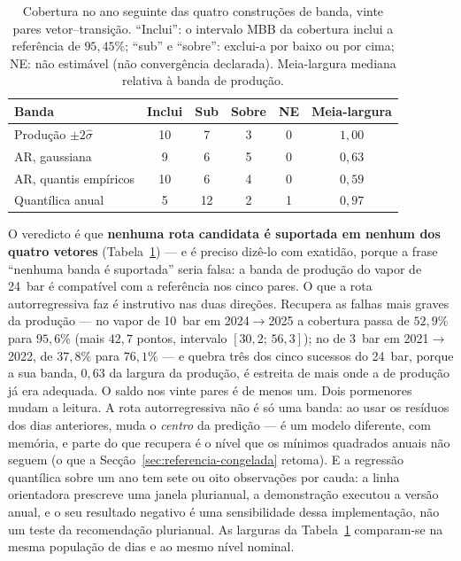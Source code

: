 \begin{table}[htbp]
  \centering
  \caption[Bandas alternativas nos vinte pares]{Cobertura no ano seguinte
  das quatro construções de banda, vinte pares vetor--transição. ``Inclui'':
  o intervalo MBB da cobertura inclui a referência de $95{,}45\%$; ``sub'' e
  ``sobre'': exclui-a por baixo ou por cima; NE: não estimável (não
  convergência declarada). Meia-largura mediana relativa à banda de
  produção.}
  \label{tab:bandas}
  \begin{tabular}{lccccc}
    \toprule
    Banda & Inclui & Sub & Sobre & NE & Meia-largura \\
    \midrule
    Produção $\pm 2\hat\sigma$   & 10 & 7  & 3 & 0 & $1{,}00$ \\
    AR, gaussiana                & 9  & 6  & 5 & 0 & $0{,}63$ \\
    AR, quantis empíricos        & 10 & 6  & 4 & 0 & $0{,}59$ \\
    Quantílica anual             & 5  & 12 & 2 & 1 & $0{,}97$ \\
    \bottomrule
  \end{tabular}
\end{table}

O veredicto é que \textbf{nenhuma rota candidata é suportada em nenhum dos
quatro vetores} (Tabela~\ref{tab:bandas}) --- e é preciso dizê-lo com
exatidão, porque a frase ``nenhuma banda é suportada'' seria falsa: a banda
de produção do vapor de 24~bar é compatível com a referência nos cinco pares.
O que a rota autorregressiva faz é instrutivo nas duas direções. Recupera
as falhas mais graves da produção --- no vapor de 10~bar em 2024${\to}$2025
a cobertura passa de $52{,}9\%$ para $95{,}6\%$ (mais $42{,}7$ pontos,
intervalo $[30{,}2;\,56{,}3]$); no de 3~bar em 2021${\to}$2022, de $37{,}8\%$
para $76{,}1\%$ --- e quebra três dos cinco sucessos do 24~bar, porque a sua
banda, $0{,}63$ da largura da produção, é estreita de mais onde a de
produção já era adequada. O saldo nos vinte pares é de menos um. Dois
pormenores mudam a leitura. A rota autorregressiva não é só uma banda: ao
usar os resíduos dos dias anteriores, muda o \emph{centro} da predição ---
é um modelo diferente, com memória, e parte do que recupera é o nível que os
mínimos quadrados anuais não seguem (o que a Secção~\ref{sec:referencia-congelada}
retoma). E a regressão quantílica sobre um ano tem sete ou oito observações
por cauda: a linha orientadora prescreve uma janela plurianual, a
demonstração executou a versão anual, e o seu resultado negativo é uma
sensibilidade dessa implementação, não um teste da recomendação
plurianual. As larguras da Tabela~\ref{tab:bandas} comparam-se na mesma
população de dias e ao mesmo nível nominal.

